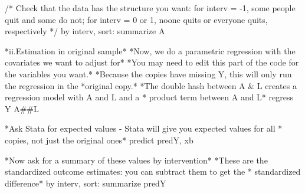 \documentclass[
  10pt,
  a4paper,
]{book}
\newenvironment{Shaded}{\begin{snugshade}}{\end{snugshade}}
\newcommand{\CommentTok}[1]{\textcolor[rgb]{0.37,0.37,0.37}{#1}}
\newcommand{\FunctionTok}[1]{\textcolor[rgb]{0.28,0.35,0.67}{#1}}
\newcommand{\KeywordTok}[1]{\textcolor[rgb]{0.00,0.46,0.62}{#1}}
\newcommand{\NormalTok}[1]{\textcolor[rgb]{0.00,0.46,0.62}{#1}}
\newcommand{\OtherTok}[1]{\textcolor[rgb]{0.00,0.46,0.62}{#1}}
\begin{document}
\begin{Shaded}
\begin{Highlighting}[]
\CommentTok{/* Check that the data has the structure you want: }
\CommentTok{for interv = {-}1, some people quit and some do not; }
\CommentTok{for interv = 0 or 1, noone quits or everyone quits, respectively */}
\KeywordTok{by}\NormalTok{ interv, }\KeywordTok{sort}\NormalTok{: }\KeywordTok{summarize}\NormalTok{ A}

\NormalTok{*ii.Estimation }\KeywordTok{in}\NormalTok{ original }\KeywordTok{sample}\NormalTok{*}
\NormalTok{*Now, we }\KeywordTok{do}\NormalTok{ a parametric regression with the covariates we want to }\KeywordTok{adjust} \KeywordTok{for}\NormalTok{*}
\NormalTok{*You may need to edit }\KeywordTok{this}\NormalTok{ part }\KeywordTok{of}\NormalTok{ the code }\KeywordTok{for}\NormalTok{ the variables you want.*}
\NormalTok{*Because the copies have }\FunctionTok{missing}\NormalTok{ Y, }\KeywordTok{this}\NormalTok{ will only }\KeywordTok{run}\NormalTok{ the regression }\KeywordTok{in}\NormalTok{ the}
\NormalTok{*original copy.*}
\NormalTok{*The }\KeywordTok{double}\NormalTok{ hash between A \& L creates a regression }\KeywordTok{model}\NormalTok{ with A and L and a }
\NormalTok{* product term between A and L*}
\KeywordTok{regress}\NormalTok{ Y A\#\#L}

\NormalTok{*Ask Stata }\KeywordTok{for}\NormalTok{ expected }\KeywordTok{values}\NormalTok{ {-} Stata will give you expected }\KeywordTok{values} \KeywordTok{for} \OtherTok{all} 
\NormalTok{* copies, }\KeywordTok{not}\NormalTok{ just the original ones*}
\KeywordTok{predict}\NormalTok{ predY, }\KeywordTok{xb}

\NormalTok{*Now ask }\KeywordTok{for}\NormalTok{ a summary }\KeywordTok{of}\NormalTok{ these }\KeywordTok{values} \KeywordTok{by}\NormalTok{ intervention*}
\NormalTok{*These are the standardized outcome }\KeywordTok{estimates}\NormalTok{: you can subtract them to }\FunctionTok{get}\NormalTok{ the}
\NormalTok{* standardized difference*}
\KeywordTok{by}\NormalTok{ interv, }\KeywordTok{sort}\NormalTok{: }\KeywordTok{summarize}\NormalTok{ predY}


\end{Highlighting}
\end{Shaded}
\end{document}
